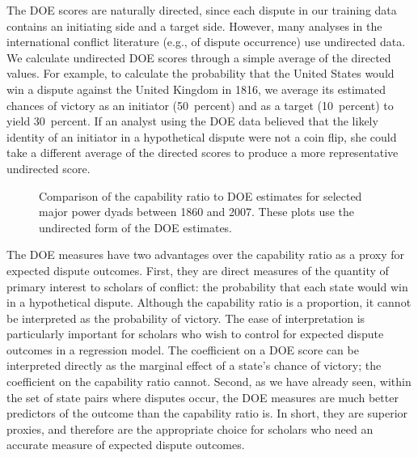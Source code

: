 The DOE scores are naturally directed, since each dispute in our training data contains an initiating side and a target side.
However, many analyses in the international conflict literature (e.g., of dispute occurrence) use undirected data.
We calculate undirected DOE scores through a simple average of the directed values.
For example, to calculate the probability that the United States would win a dispute against the United Kingdom in 1816, we average its estimated chances of victory as an initiator (50~percent) and as a target (10~percent) to yield 30~percent.
If an analyst using the DOE data believed that the likely identity of an initiator in a hypothetical dispute were not a coin flip, she could take a different average of the directed scores to produce a more representative undirected score.

\begin{figure}[tp]
  \centering
  
  \vspace{-2em}
  \caption{
    Comparison of the capability ratio to DOE estimates for selected major power dyads between 1860 and 2007.
    These plots use the undirected form of the DOE estimates.
  }
  \label{fig:vs}
\end{figure}

The DOE measures have two advantages over the capability ratio as a proxy for expected dispute outcomes.
First, they are direct measures of the quantity of primary interest to scholars of conflict: the probability that each state would win in a hypothetical dispute.
Although the capability ratio is a proportion, it cannot be interpreted as the probability of victory.
The ease of interpretation is particularly important for scholars who wish to control for expected dispute outcomes in a regression model.
The coefficient on a DOE score can be interpreted directly as the marginal effect of a state's chance of victory; the coefficient on the capability ratio cannot.
Second, as we have already seen, within the set of state pairs where disputes occur, the DOE measures are much better predictors of the outcome than the capability ratio is.
In short, they are superior proxies, and therefore are the appropriate choice for scholars who need an accurate measure of expected dispute outcomes.

